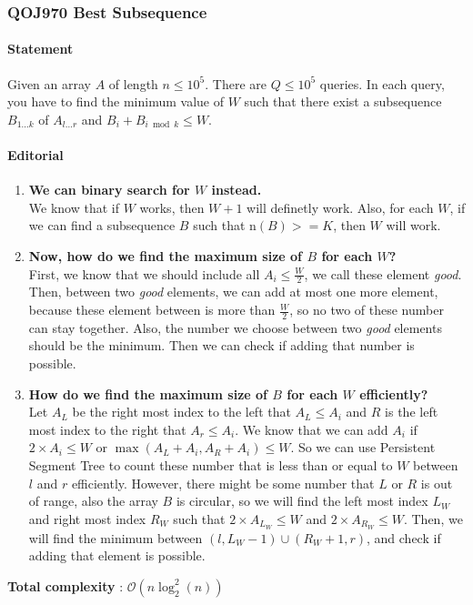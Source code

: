 \subsubsection{QOJ970 Best Subsequence}


\paragraph{Statement}
Given an array $A$ of length $n \le 10^5$.
There are $Q \le 10^5$ queries.
In each query, you have to find the minimum value of $W$ such that there exist a subsequence $B_{1 \dots k}$ of $A_{l \dots r}$ and $B_i + B_{i \bmod k} \le W$.

\paragraph{Editorial}
\begin{enumerate}
    \item \textbf{We can binary search for $W$ instead.}\\
    We know that if $W$ works, then $W+1$ will definetly work.
    Also, for each $W$, if we can find a subsequence $B$ such that $\text{n}(B) >= K$, then $W$ will work.
    \item \textbf{Now, how do we find the maximum size of $B$ for each $W$?}\\
    First, we know that we should include all $A_i \le \frac{W}{2}$, we call these element \textit{good}.
    Then, between two \textit{good} elements, we can add at most one more element, because these element between is more than $\frac{W}{2}$, so no two of these number can stay together.
    Also, the number we choose between two \textit{good} elements should be the minimum.
    Then we can check if adding that number is possible.
    \item \textbf{How do we find the maximum size of $B$ for each $W$ efficiently?}\\
    Let $A_L$ be the right most index to the left that $A_L \le A_i$ and $R$ is the left most index to the right that $A_r \le A_i$.
    We know that we can add $A_i$ if $2 \times A_i \le W$ or $\max(A_L + A_i, A_R + A_i) \le W$.
    So we can use Persistent Segment Tree to count these number that is less than or equal to $W$ between $l$ and $r$ efficiently.
    However, there might be some number that $L$ or $R$ is out of range, also the array $B$ is circular,  so we will find the left most index $L_W$ and right most index $R_W$ such that $2 \times A_{L_W} \le W$ and $2 \times A_{R_W} \le W$.
    Then, we will find the minimum between $(l, L_W-1) \cup (R_W+1, r)$, and check if adding that element is possible.
\end{enumerate}
\textbf{Total complexity} : $\mathcal{O}(n\log_2^2(n))$

